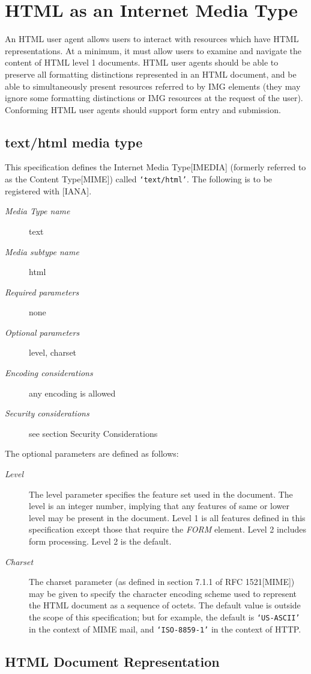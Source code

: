 \section*{HTML as an Internet Media Type}\par 
An HTML user agent allows users to interact with resources which have
HTML representations.  At a minimum, it must allow users to examine and
navigate the content of HTML level 1 documents.  HTML user agents
should be able to preserve all formatting distinctions represented in
an HTML document, and be able to simultaneously present resources
referred to by IMG elements (they may ignore some formatting
distinctions or IMG resources at the request of the user).  Conforming
HTML user agents should support form entry and submission.
\par \subsection*{text/html media type}\par 
This specification defines the Internet Media Type[IMEDIA] (formerly
referred to as the Content Type[MIME]) called {\tt `text/html'}.  The
following is to be registered with [IANA].
\par \begin{description}\item[{\it Media Type name}]
text
\item[{\it Media subtype name}]
html
\item[{\it Required parameters}]
none
\item[{\it Optional parameters}]
level, charset
\item[{\it Encoding considerations}]
any encoding is allowed
\item[{\it Security considerations}]
see section Security Considerations\end{description}\par 
The optional parameters are defined as follows:
\par \begin{description}\item[{\it Level}]
The level parameter specifies the feature set used in the
document.  The level is an integer number, implying that any features
of same or lower level may be present in the document.  Level 1 is all
features defined in this specification except those that require the
{\it FORM} element.  Level 2 includes form processing.  Level 2 is the
default.
\item[{\it Charset}]
The charset parameter (as defined in section 7.1.1 of
RFC 1521[MIME]) may be given to specify the character encoding scheme
used to represent the HTML document as a sequence of octets.  The
default value is outside the scope of this specification;  but for
example, the default is {\tt `US-ASCII'} in the context of MIME mail,
and {\tt `ISO-8859-1'} in the context of HTTP.
\end{description}\subsection*{HTML Document Representation}\par 
